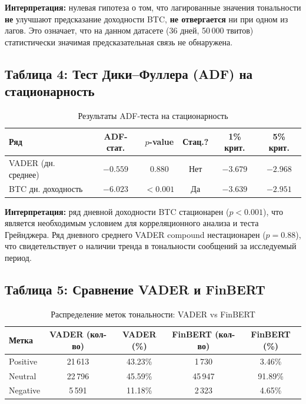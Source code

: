 \documentclass[a4paper,12pt]{article}
\begin{document}
\textbf{Интерпретация:} нулевая гипотеза о том, что лагированные значения тональности
\textbf{не} улучшают предсказание доходности BTC, \textbf{не отвергается} ни при одном
из лагов. Это означает, что на данном датасете (36 дней, 50\,000 твитов)
статистически значимая предсказательная связь не обнаружена.

\subsection{Таблица 4: Тест Дики--Фуллера (ADF) на стационарность}

\begin{table}[H]
\centering
\caption{Результаты ADF-теста на стационарность}
\label{tab:adf}
\begin{tabular}{|l|c|c|c|c|c|}
\hline
\textbf{Ряд} & \textbf{ADF-стат.} & \textbf{$p$-value} & \textbf{Стац.?} & \textbf{1\% крит.} & \textbf{5\% крит.} \\
\hline
VADER (дн. среднее) & $-0.559$ & 0.880 & Нет & $-3.679$ & $-2.968$ \\
BTC дн. доходность & $-6.023$ & $<0.001$ & Да & $-3.639$ & $-2.951$ \\
\hline
\end{tabular}
\end{table}

\textbf{Интерпретация:} ряд дневной доходности BTC стационарен ($p < 0.001$),
что является необходимым условием для корреляционного анализа и теста Грейнджера.
Ряд дневного среднего VADER compound нестационарен ($p = 0.88$), что
свидетельствует о наличии тренда в тональности сообщений за исследуемый период.

\subsection{Таблица 5: Сравнение VADER и FinBERT}

\begin{table}[H]
\centering
\caption{Распределение меток тональности: VADER vs FinBERT}
\label{tab:vader_finbert}
\begin{tabular}{|l|c|c|c|c|}
\hline
\textbf{Метка} & \textbf{VADER (кол-во)} & \textbf{VADER (\%)} & \textbf{FinBERT (кол-во)} & \textbf{FinBERT (\%)} \\
\hline
Positive & 21\,613 & 43.23\% & 1\,730 & 3.46\% \\
Neutral & 22\,796 & 45.59\% & 45\,947 & 91.89\% \\
Negative & 5\,591 & 11.18\% & 2\,323 & 4.65\% \\
\hline
\end{tabular}
\end{table}
\end{document}
